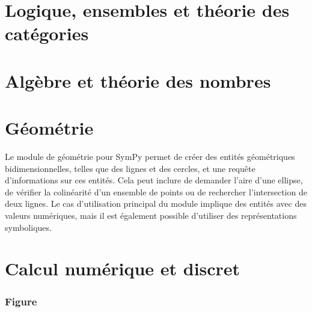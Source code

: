 \documentclass[11pt,fleqn]{book} %
\begin{document}
\part{Logique, ensembles et théorie des catégories}



\part{Algèbre et théorie des nombres}







\part{Géométrie}
Le module de géométrie pour SymPy permet de créer des entités géométriques bidimensionnelles, telles que des lignes et des cercles, et une requête d'informations sur ces entités. Cela peut inclure de demander l’aire d’une ellipse, de vérifier la colinéarité d’un ensemble de points ou de rechercher l’intersection de deux lignes. Le cas d'utilisation principal du module implique des entités avec des valeurs numériques, mais il est également possible d'utiliser des représentations symboliques.




\part{Calcul numérique et discret}





\section{Figure}
\end{document}
